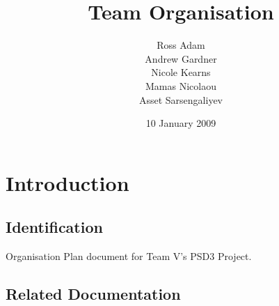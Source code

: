 \documentclass{l3deliverable}
\title{Team Organisation}
\author{Ross Adam\\
     	Andrew Gardner\\
     	Nicole Kearns\\
 	Mamas Nicolaou\\
    	Asset Sarsengaliyev\\
}
\date{10 January 2009}
\begin{document}

\maketitle


\section{Introduction}

\subsection{Identification}

Organisation Plan document for Team V’s PSD3 Project.

\subsection{Related Documentation}
\end{document}
